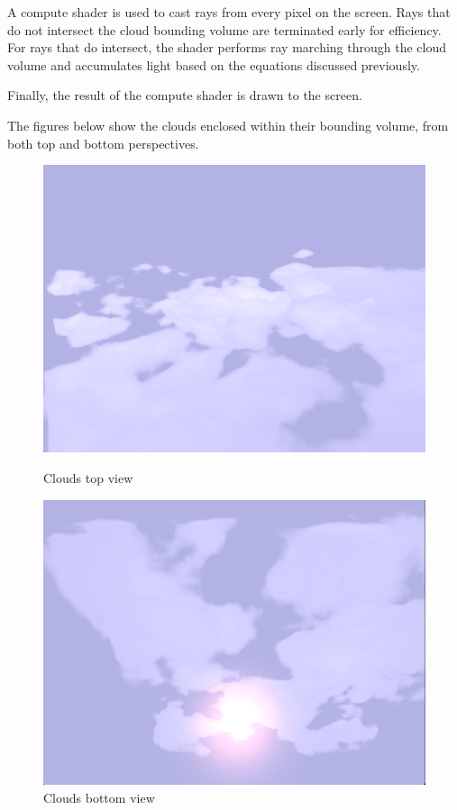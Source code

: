 A compute shader is used to cast rays from every pixel on the screen. Rays that do not intersect the cloud bounding volume are terminated early for efficiency. For rays that do intersect, the shader performs ray marching through the cloud volume and accumulates light based on the equations discussed previously.

Finally, the result of the compute shader is drawn to the screen.

The figures below show the clouds enclosed within their bounding volume, from both top and bottom perspectives.

\begin{figure}[H]
    \centering
    \begin{minipage}[t]{0.45\textwidth}
        \centering
        \includegraphics[width=\textwidth]{images/clouds1.png}
        \caption{Clouds top view}
    \end{minipage}
    \hfill
    \begin{minipage}[t]{0.45\textwidth}
        \centering
        \includegraphics[width=\textwidth]{images/clouds2.png}
        \caption{Clouds bottom view}
    \end{minipage}
\end{figure}

